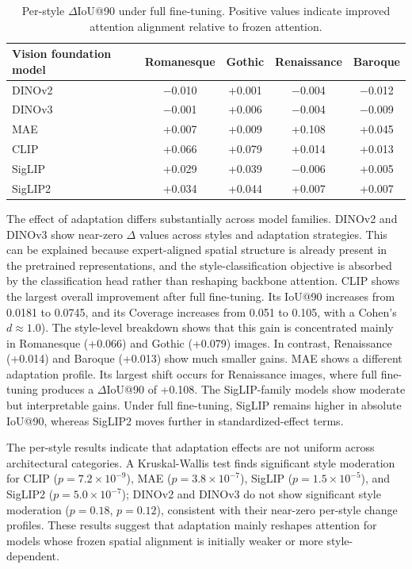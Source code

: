 \documentclass[lineno,pdflatex,sn-mathphys-num]{sn-jnl}%
\theoremstyle{thmstyleone}%
\theoremstyle{thmstyletwo}%
\theoremstyle{thmstylethree}%
\begin{document}
\begin{table}[!h]
\centering
\caption{Per-style $\Delta$IoU@90 under full fine-tuning. Positive values indicate improved attention alignment relative to frozen attention.}
\label{table RQ3 perstyle}
\begin{tabular}{lcccc}
\toprule
Vision foundation model & Romanesque & Gothic & Renaissance & Baroque \\ \midrule
DINOv2  & $-$0.010 & +0.001 & $-$0.004 & $-$0.012 \\
DINOv3  & $-$0.001 & +0.006 & $-$0.004 & $-$0.009 \\
MAE     & +0.007 & +0.009 & +0.108 & +0.045 \\
CLIP    & +0.066 & +0.079 & +0.014 & +0.013 \\
SigLIP  & +0.029 & +0.039 & $-$0.006 & +0.005 \\
SigLIP2 & +0.034 & +0.044 & +0.007 & +0.007 \\
\bottomrule
\end{tabular}
\end{table}

The effect of adaptation differs substantially across model families. DINOv2 and DINOv3 show near-zero $\Delta$ values across styles and adaptation strategies. This can be explained because expert-aligned spatial structure is already present in the pretrained representations, and the style-classification objective is absorbed by the classification head rather than reshaping backbone attention. CLIP shows the largest overall improvement after full fine-tuning. Its IoU@90 increases from 0.0181 to 0.0745, and its Coverage increases from 0.051 to 0.105, with a Cohen's $d \approx 1.0$). The style-level breakdown shows that this gain is concentrated mainly in Romanesque (+0.066) and Gothic (+0.079) images. In contrast, Renaissance (+0.014) and Baroque (+0.013) show much smaller gains. MAE shows a different adaptation profile. Its largest shift occurs for Renaissance images, where full fine-tuning produces a $\Delta$IoU@90 of +0.108. The SigLIP-family models show moderate but interpretable gains. Under full fine-tuning, SigLIP remains higher in absolute IoU@90, whereas SigLIP2 moves further in standardized-effect terms. 

The per-style results indicate that adaptation effects are not uniform across architectural categories. A Kruskal-Wallis test finds significant style moderation for CLIP ($p=7.2\times10^{-9}$), MAE ($p=3.8\times10^{-7}$), SigLIP ($p=1.5\times10^{-5}$), and SigLIP2 ($p=5.0\times10^{-7}$); DINOv2 and DINOv3 do not show significant style moderation ($p=0.18$, $p=0.12$), consistent with their near-zero per-style change profiles. These results suggest that adaptation mainly reshapes attention for models whose frozen spatial alignment is initially weaker or more style-dependent.
\end{document}
